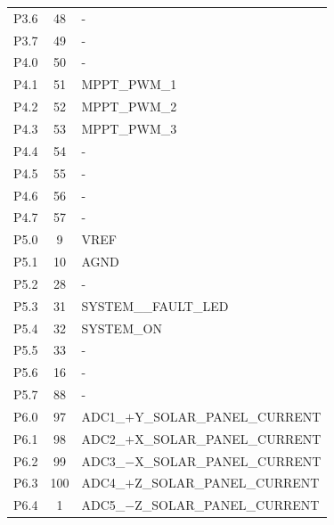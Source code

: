 \begin{longtable}{lcl}
    P3.6              & 48                  & -                     \\
    P3.7              & 49                  & -                     \\
    \midrule
    P4.0              & 50                  & -                     \\
    P4.1              & 51                  & MPPT\_PWM\_1          \\
    P4.2              & 52                  & MPPT\_PWM\_2          \\
    P4.3              & 53                  & MPPT\_PWM\_3          \\
    P4.4              & 54                  & -                     \\
    P4.5              & 55                  & -                     \\
    P4.6              & 56                  & -                     \\
    P4.7              & 57                  & -                     \\
    \midrule
    P5.0              & 9                   & VREF                  \\
    P5.1              & 10                  & AGND                  \\
    P5.2              & 28                  & -                     \\
    P5.3              & 31                  & SYSTEM\_\_FAULT\_LED  \\
    P5.4              & 32                  & SYSTEM\_ON           \\
    P5.5              & 33                  & -                     \\
    P5.6              & 16                  & -                     \\
    P5.7              & 88                  & -                     \\
    \midrule
    P6.0              & 97                  & ADC1\_$+$Y\_SOLAR\_PANEL\_CURRENT \\
    P6.1              & 98                  & ADC2\_$+$X\_SOLAR\_PANEL\_CURRENT \\
    P6.2              & 99                  & ADC3\_$-$X\_SOLAR\_PANEL\_CURRENT \\
    P6.3              & 100                 & ADC4\_$+$Z\_SOLAR\_PANEL\_CURRENT \\
    P6.4              & 1                   & ADC5\_$-$Z\_SOLAR\_PANEL\_CURRENT \\

\end{longtable}

